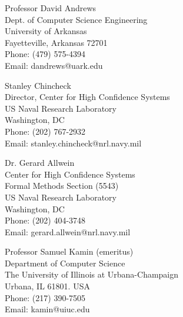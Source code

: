 \documentclass[11pt]{article}
\begin{document}
\begin{minipage}[t]{3.1in}
\begin{flushleft}
Professor David Andrews\\
Dept. of Computer Science Engineering \\
University of Arkansas\\ 
Fayetteville, Arkansas 72701 \\
Phone: (479) 575-4394 \\
Email: dandrews@uark.edu
\end{flushleft}
\end{minipage}
\begin{minipage}[t]{3.1in}
\begin{flushleft}
Stanley Chincheck\\
Director, Center for High Confidence Systems\\
US Naval Research Laboratory\\ 
Washington, DC  \\
Phone:  (202) 767-2932 \\
Email: stanley.chincheck@nrl.navy.mil
\end{flushleft}
\end{minipage}
\vspace{3ex}

\begin{minipage}[t]{3.1in}
\begin{flushleft}
Dr. Gerard Allwein\\
Center for High Confidence Systems\\
Formal Methods Section (5543)\\
US Naval Research Laboratory\\ 
Washington, DC  \\
Phone: (202) 404-3748 \\
Email: gerard.allwein@nrl.navy.mil
\end{flushleft}
\end{minipage}
\begin{minipage}[t]{3.1in}
\begin{flushleft}
Professor Samuel Kamin (emeritus)\\
Department of Computer Science\\
The University of Illinois at Urbana-Champaign\\
Urbana, IL 61801. USA\\
Phone: (217) 390-7505\\
Email: kamin@uiuc.edu
\end{flushleft}
\end{minipage}
\end{document}
